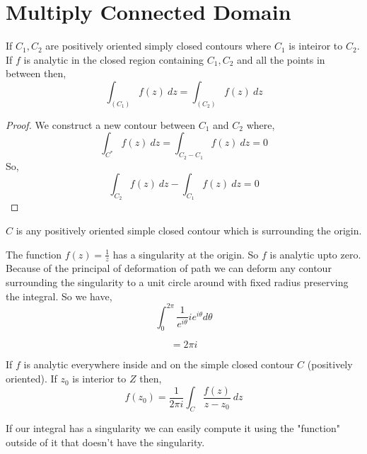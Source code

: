\section{Multiply Connected Domain}

\begin{corollary}
   If $C_1, C_2$ are positively oriented simply closed contours where $C_1$ is inteiror to $C_2$. If $f$ is analytic in the closed region containing $C_1,C_2$ and all the points in between then, 
   $$ \int_(C_1) f(z) \:dz = \int_(C_2) f(z) \:dz $$ 
\end{corollary}


\begin{proof}
   We construct a new contour between $C_1$ and $C_2$ where, 
   $$ \int_{C^*} f(z) \:dz = \int_{C_2 - C_1}f(z) \:dz = 0 $$  So, 
   $$ \int_{C_2} f(z) \:dz - \int_{C_1}f(z) \:dz = 0 $$ 
\end{proof}



\begin{eg}
   $C$ is any positively oriented simple closed contour which is surrounding the origin. 
\end{eg}

The function $f(z) = \frac{1}{z}$ has a singularity at the origin. So $f$ is analytic upto zero. Because of the principal of deformation of path we can deform any contour surrounding the singularity to a unit circle around with fixed radius preserving the integral. So we have, 
$$ \int_0^{2\pi} \frac{1}{e^{i\theta}}i e^{i\theta}d\theta $$ 

$$= 2\pi i $$ 


\begin{theorem}
   If $f$ is analytic everywhere inside and on the simple closed contour $C$ (positively oriented). If $z_0$ is interior to $Z$ then, 
   $$ f(z_0) = \frac{1}{2\pi i} \int_C \frac{f(z)}{z - z_0}\:dz$$ 
\end{theorem}
\begin{remark}
   If our integral has a singularity we can easily compute it using the "function" outside of it that doesn't have the singularity.
\end{remark}

